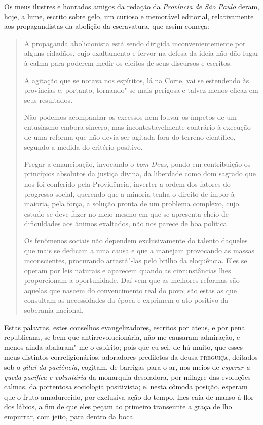 \noindent{}Os meus ilustres e honrados amigos da redação da \emph{Província de São
Paulo} deram, hoje, a lume, escrito sobre gelo, um curioso e memorável
editorial, relativamente aos propagandistas da abolição da escravatura,
que assim começa:

\begin{quote}
A propaganda abolicionista está sendo dirigida inconvenientemente por
alguns cidadãos, cujo exaltamento e fervor na defesa da ideia não dão
lugar à calma para poderem medir os efeitos de seus discursos e
escritos.

A agitação que se notava nos espíritos, lá na Corte, vai se estendendo
às províncias e, portanto, tornando"-se mais perigosa e talvez menos
eficaz em seus resultados.

Não podemos acompanhar os excessos nem louvar os ímpetos de um
entusiasmo embora sincero, mas incontestavelmente contrário à execução
de uma reforma que não devia ser agitada fora do terreno científico,
segundo a medida do critério positivo.

Pregar a emancipação, invocando o \emph{bom Deus}, pondo em contribuição
os princípios absolutos da justiça divina, da liberdade como dom sagrado
que nos foi conferido pela Providência, inverter a ordem dos fatores do
progresso social, querendo que a minoria tenha o direito de impor à
maioria, pela força, a solução pronta de um problema complexo, cujo
estudo se deve fazer no meio mesmo em que se apresenta cheio de
dificuldades aos ânimos exaltados, não nos parece de boa política.

Os fenômenos sociais não dependem exclusivamente do talento daqueles que
mais se dedicam a uma causa e que a manejam provocando as massas
inconscientes, procurando arrastá"-las pelo brilho da eloquência. Eles se
operam por leis naturais e aparecem quando as circunstâncias lhes
proporcionam a oportunidade. Daí vem que as melhores reformas são
aquelas que nascem do convencimento real do povo; são estas as que
consultam as necessidades da época e exprimem o ato positivo da
soberania nacional.
\end{quote}

\noindent\dotfill{}

Estas palavras, estes conselhos evangelizadores, escritos por ateus, e
por pena republicana, se bem que antirrevolucionária, não me causaram
admiração, e menos ainda abalaram"-me o espírito; pois que eu sei, de há
muito, que esses meus distintos correligionários, adoradores prediletos
da deusa \textsc{preguiça}, deitados sob o \emph{gitai da paciência}, cogitam, de
barrigas para o ar, nos meios de \emph{esperar a queda pacífica e
voluntária} da monarquia desoladora, por milagre das evoluções calmas,
da portentosa sociologia positivista; e, nesta cômoda posição, esperam
que o fruto amadurecido, por exclusiva ação do tempo, lhes caía de manso
à flor dos lábios, a fim de que eles peçam ao primeiro transeunte a
graça de lho empurrar, com jeito, para dentro da boca.

